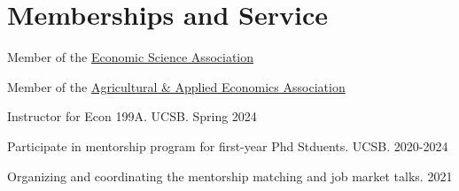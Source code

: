 
\section{Memberships and Service}

{Member of the \href{https://www.economicscience.org/}{Economic Science Association}}
{}
{}
{}{}

{Member of the \href{https://www.aaea.org/}{Agricultural \& Applied Economics Association}}
{}
{}
{}{}



{Instructor for Econ 199A.}
{UCSB.}
{Spring 2024}{}{}

{Participate in mentorship program for first-year Phd Stduents.}
{UCSB.}
{}{}{2020-2024}

{Organizing and coordinating the mentorship matching and job market talks.}
{}{}{2021}





